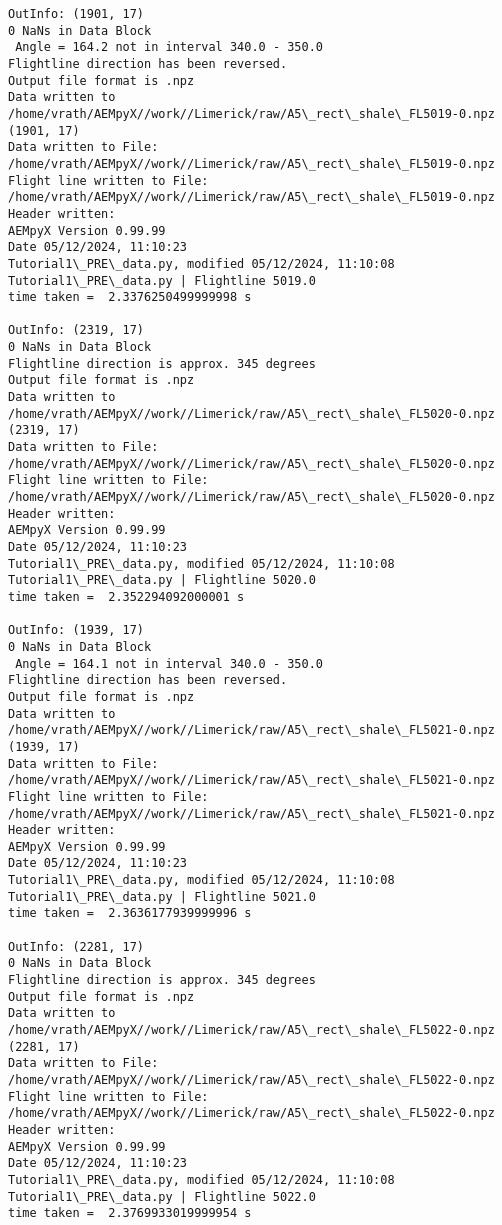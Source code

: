 \documentclass[11pt]{article}
\begin{document}
\begin{Verbatim}[commandchars=\\\{\}]
OutInfo: (1901, 17)
0 NaNs in Data Block
 Angle = 164.2 not in interval 340.0 - 350.0
Flightline direction has been reversed.
Output file format is .npz
Data written to
/home/vrath/AEMpyX//work//Limerick/raw/A5\_rect\_shale\_FL5019-0.npz
(1901, 17)
Data written to File:
/home/vrath/AEMpyX//work//Limerick/raw/A5\_rect\_shale\_FL5019-0.npz
Flight line written to File:
/home/vrath/AEMpyX//work//Limerick/raw/A5\_rect\_shale\_FL5019-0.npz
Header written:
AEMpyX Version 0.99.99
Date 05/12/2024, 11:10:23
Tutorial1\_PRE\_data.py, modified 05/12/2024, 11:10:08
Tutorial1\_PRE\_data.py | Flightline 5019.0
time taken =  2.3376250499999998 s

OutInfo: (2319, 17)
0 NaNs in Data Block
Flightline direction is approx. 345 degrees
Output file format is .npz
Data written to
/home/vrath/AEMpyX//work//Limerick/raw/A5\_rect\_shale\_FL5020-0.npz
(2319, 17)
Data written to File:
/home/vrath/AEMpyX//work//Limerick/raw/A5\_rect\_shale\_FL5020-0.npz
Flight line written to File:
/home/vrath/AEMpyX//work//Limerick/raw/A5\_rect\_shale\_FL5020-0.npz
Header written:
AEMpyX Version 0.99.99
Date 05/12/2024, 11:10:23
Tutorial1\_PRE\_data.py, modified 05/12/2024, 11:10:08
Tutorial1\_PRE\_data.py | Flightline 5020.0
time taken =  2.352294092000001 s

OutInfo: (1939, 17)
0 NaNs in Data Block
 Angle = 164.1 not in interval 340.0 - 350.0
Flightline direction has been reversed.
Output file format is .npz
Data written to
/home/vrath/AEMpyX//work//Limerick/raw/A5\_rect\_shale\_FL5021-0.npz
(1939, 17)
Data written to File:
/home/vrath/AEMpyX//work//Limerick/raw/A5\_rect\_shale\_FL5021-0.npz
Flight line written to File:
/home/vrath/AEMpyX//work//Limerick/raw/A5\_rect\_shale\_FL5021-0.npz
Header written:
AEMpyX Version 0.99.99
Date 05/12/2024, 11:10:23
Tutorial1\_PRE\_data.py, modified 05/12/2024, 11:10:08
Tutorial1\_PRE\_data.py | Flightline 5021.0
time taken =  2.3636177939999996 s

OutInfo: (2281, 17)
0 NaNs in Data Block
Flightline direction is approx. 345 degrees
Output file format is .npz
Data written to
/home/vrath/AEMpyX//work//Limerick/raw/A5\_rect\_shale\_FL5022-0.npz
(2281, 17)
Data written to File:
/home/vrath/AEMpyX//work//Limerick/raw/A5\_rect\_shale\_FL5022-0.npz
Flight line written to File:
/home/vrath/AEMpyX//work//Limerick/raw/A5\_rect\_shale\_FL5022-0.npz
Header written:
AEMpyX Version 0.99.99
Date 05/12/2024, 11:10:23
Tutorial1\_PRE\_data.py, modified 05/12/2024, 11:10:08
Tutorial1\_PRE\_data.py | Flightline 5022.0
time taken =  2.3769933019999954 s


\end{Verbatim}
\end{document}
